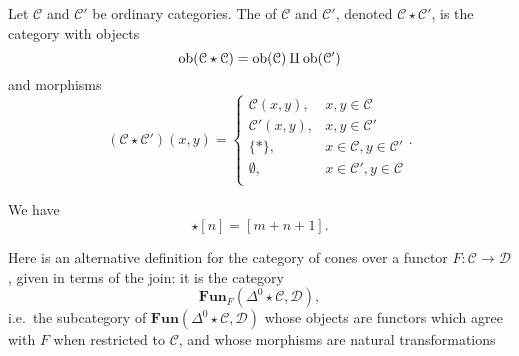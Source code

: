 \documentclass[main.tex]{subfiles}
\begin{document}
\begin{definition}
  \label{def:join_of_categories}
  Let $\mathcal{C}$ and $\mathcal{C}'$ be ordinary categories. The  of $\mathcal{C}$ and $\mathcal{C}'$, denoted $\mathcal{C} \star \mathcal{C}'$, is the category with objects
  \begin{equation*}
    \operatorname{\mathrm{ob}}(\mathcal{C} \star \mathcal{C}) = \operatorname{\mathrm{ob}}(\mathcal{C}) \amalg \operatorname{\mathrm{ob}}(\mathcal{C}')
  \end{equation*}
  and morphisms
  \begin{equation*}
    (\mathcal{C} \star \mathcal{C}')(x, y) =
    \begin{cases}
      \mathcal{C}(x, y), & x, y \in \mathcal{C} \\
      \mathcal{C}'(x, y), & x, y \in \mathcal{C}' \\
      \{*\}, & x \in \mathcal{C}, y \in \mathcal{C}' \\
      \emptyset, & x \in \mathcal{C}', y \in \mathcal{C} \\
    \end{cases}.
  \end{equation*}
\end{definition}

\begin{example}
  We have
  \begin{equation*}
    [m] \star [n] = [m + n + 1].
  \end{equation*}
\end{example}

\begin{example}
  Here is an alternative definition for the category of cones over a functor $F\colon \mathcal{C} \to \mathcal{D}$, given in terms of the join: it is the category
  \begin{equation*}
    \mathbf{Fun}_{F}(\Delta^{0} \star \mathcal{C}, \mathcal{D}),
  \end{equation*}
  i.e.\ the subcategory of $\mathbf{Fun}(\Delta^{0} \star \mathcal{C}, \mathcal{D})$ whose objects are functors which agree with $F$ when restricted to $\mathcal{C}$, and whose morphisms are natural transformations
\end{example}
\end{document}
